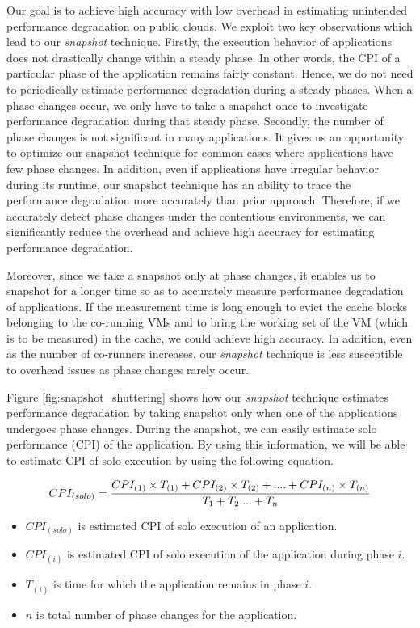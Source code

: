 \documentclass{sig-alternate}
\begin{document}
Our goal is to achieve high accuracy with low overhead in estimating unintended performance degradation on public clouds. We exploit two key observations which lead to our \textit{snapshot} technique.  Firstly, the execution behavior of applications does not drastically change within a steady phase. In other words, the CPI of a particular phase of the application remains fairly constant. Hence, we do not need to periodically estimate performance degradation during a steady phases. When a phase changes occur, we only have to take a snapshot once to investigate performance degradation during that steady phase. Secondly, the number of phase changes is not significant in many applications. It gives us an opportunity to optimize our snapshot technique for common cases where applications have few phase changes. In addition, even if applications have irregular behavior during its runtime, our snapshot technique has an ability to trace the performance degradation more accurately than prior approach. Therefore, if we accurately detect phase changes under the contentious environments, we can significantly reduce the overhead and achieve high accuracy for estimating performance degradation.

Moreover, since we take a snapshot only at phase changes, it enables us to snapshot for a longer time so as to accurately measure performance degradation of applications. If the measurement time is long enough to evict the cache blocks belonging to the co-running VMs and to bring the working set of the VM (which is to be measured) in the cache, we could achieve high accuracy. In addition, even as the number of co-runners increases, our \textit{snapshot} technique is less susceptible to overhead issues as phase changes rarely occur.

Figure \ref{fig:snapshot_shuttering} shows how our \textit{snapshot} technique estimates performance degradation by taking snapshot only when one of the applications undergoes phase changes. During the snapshot, we can easily estimate solo performance (CPI) of the application. By using this information, we will be able to estimate CPI of solo execution by using the following equation.

\begin{equation} \label{solo_equation}
\small CPI_{(solo)} = \dfrac{CPI_{(1)} \times T_{(1)} + CPI_{(2)} \times T_{(2)} + . . . . + CPI_{(n)} \times T_{(n)}}{T_{1} + T_{2} . . . . + T_{n}}
\end{equation}
\begin{itemize}
\item $CPI_{(solo)}$ is estimated CPI of solo execution of an application.
\vspace{-0.1in}
\item $CPI_{(i)}$ is estimated CPI of solo execution of the application during phase $i$.
\vspace{-0.1in}
\item $T_{(i)}$ is time for which the application remains in phase $i$.
\vspace{-0.1in}
\item $n$ is total number of phase changes for the application.
\end{itemize}
\end{document}

